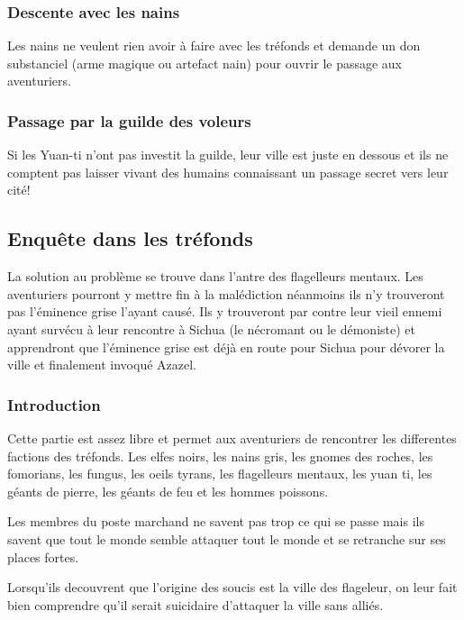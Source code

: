 \subsubsection{Descente avec les nains}

Les nains ne veulent rien avoir à faire avec les tréfonds et demande un don
substanciel (arme magique ou artefact nain) pour ouvrir le passage aux 
aventuriers.


\subsubsection{Passage par la guilde des voleurs}

Si les Yuan-ti n'ont pas investit la guilde, leur ville est juste en dessous et 
ils ne comptent pas laisser vivant des humains connaissant un passage secret 
vers leur cité!


\subsection*{Enquête dans les tréfonds}

La solution au problème se trouve dans l'antre des flagelleurs mentaux. Les aventuriers 
pourront y mettre fin à la malédiction néanmoins ils n'y trouveront pas l'éminence grise 
l'ayant causé. Ils y trouveront par contre leur vieil ennemi ayant survécu à leur rencontre 
à Sichua (le nécromant ou le démoniste) et apprendront que l'éminence grise est déjà en 
route pour Sichua pour dévorer la ville et finalement invoqué Azazel.

\subsubsection*{Introduction}

Cette partie est assez libre et permet aux aventuriers de rencontrer les differentes 
factions des tréfonds. Les elfes noirs, les nains gris, les gnomes des roches, les 
fomorians, les fungus, les oeils tyrans, les flagelleurs mentaux, les yuan ti, les 
géants de pierre, les géants de feu et les hommes poissons.

 Les membres du poste marchand ne savent pas trop ce qui se passe mais ils savent que 
tout le monde semble attaquer tout le monde et se retranche sur ses places fortes.

Lorsqu'ils decouvrent que l'origine des soucis est la ville des flageleur, on leur
fait bien comprendre qu'il serait suicidaire d'attaquer la ville sans alliés.

